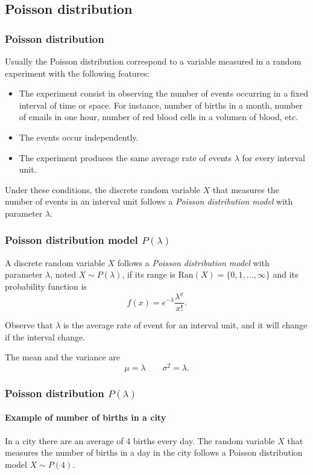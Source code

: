 \subsection{Poisson distribution}

\begin{frame}
\frametitle{Poisson distribution}
Usually the Poisson distribution correspond to a variable measured in a random experiment with the following features:
\begin{itemize}
\item The experiment consist in observing the number of events occurring in a fixed interval of time or space.
For instance, number of births in a month, number of emails in one hour, number of red blood cells in a volumen of
blood, etc. 
\item The events occur independently.
\item The experiment produces the same average rate of events $\lambda$ for every interval unit. 
\end{itemize}
Under these conditions, the discrete random variable $X$ that measures the number of events in an interval unit follows
a \emph{Poisson distribution model} with parameter $\lambda$.
\end{frame}


\begin{frame}
\frametitle{Poisson distribution model $P(\lambda)$}
\begin{definition}
A discrete random variable $X$ follows a \emph{Poisson distribution model} with parameter $\lambda$, noted 
$X\sim P(\lambda)$, if its range is $\mbox{Ran}(X) = \{0,1,\ldots,\infty\}$ and its probability function is
\[
f(x) = e^{-\lambda}\frac{\lambda^x}{x!}.
\]
\end{definition}

Observe that $\lambda$ is the average rate of event for an interval unit, and it will change if the interval change.

The mean and the variance are
\[
\mu = \lambda \qquad \sigma^2 = \lambda.
\]
\end{frame}


\begin{frame}
\frametitle{Poisson distribution $P(\lambda)$}
\framesubtitle{Example of number of births in a city}
In a city there are an average of 4 births every day. 
The random variable $X$ that measures the number of births in a day in the city follows a Poisson distribution model
$X\sim P(4)$.
\begin{center}
\end{center}
\end{frame}


